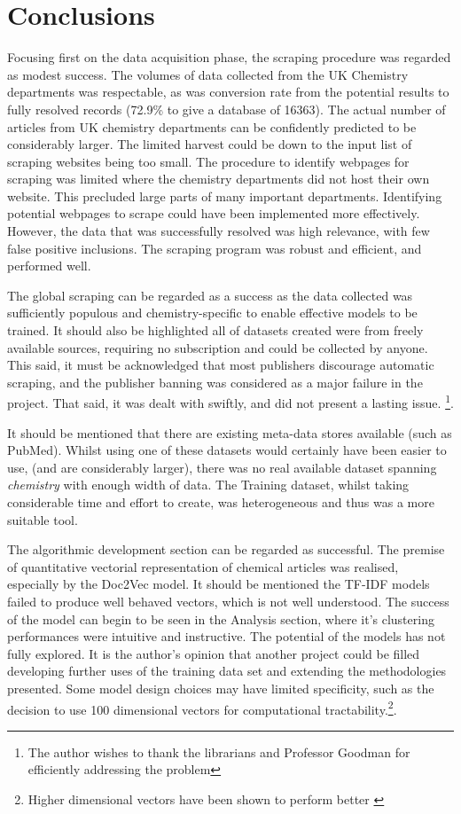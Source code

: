 \chapter{Conclusions}
Focusing first on the data acquisition phase, the scraping procedure was regarded as modest success. The volumes of data collected from the UK Chemistry departments was respectable, as was conversion rate from the potential results to fully resolved records (72.9\%  to give a database of 16363). The actual number of articles from UK chemistry departments can be confidently predicted to be considerably larger. The limited harvest could be down to the input list of scraping websites being too small. The procedure to identify webpages for scraping was limited where the chemistry departments did not host their own website. This  precluded large parts of many important departments. Identifying potential webpages to scrape could have been implemented more effectively.  However, the data that was successfully resolved was high relevance, with few false positive inclusions. The scraping program was robust and efficient, and performed well. 

The global scraping can be regarded as a success as the data collected was sufficiently populous and chemistry-specific  to enable effective models to be trained. It should also be highlighted all of datasets created were from freely available sources, requiring no subscription and could be collected by anyone. This said, it must be acknowledged that most publishers discourage automatic scraping, and the publisher banning was considered as a major failure in the project. That said, it was dealt with swiftly, and did not present a lasting issue. \footnote{The author wishes to thank the librarians and Professor Goodman for efficiently addressing the problem}.

 It should be mentioned that there are existing meta-data stores available (such as PubMed). Whilst using one of these datasets would certainly have been easier to use, (and  are considerably larger), there was no real available dataset spanning \emph{chemistry} with enough width of data. The Training dataset, whilst taking considerable time and effort to create, was heterogeneous and thus was a more suitable tool.

The algorithmic development section can be regarded as successful. The premise of quantitative vectorial representation of chemical articles was realised, especially by the Doc2Vec model. It should be mentioned the TF-IDF models failed to produce well behaved vectors, which is not well understood. The success of the model can begin to be seen in the Analysis section, where it's clustering performances were intuitive and instructive. The potential of the models has not fully explored. It is the author's opinion that another project could be filled developing further uses of the training data set and extending the methodologies presented. 
Some model design choices may have limited specificity, such as the decision to use 100 dimensional vectors for computational tractability.\footnote{Higher dimensional vectors have been shown to perform better \cite{word2vec1}}.

